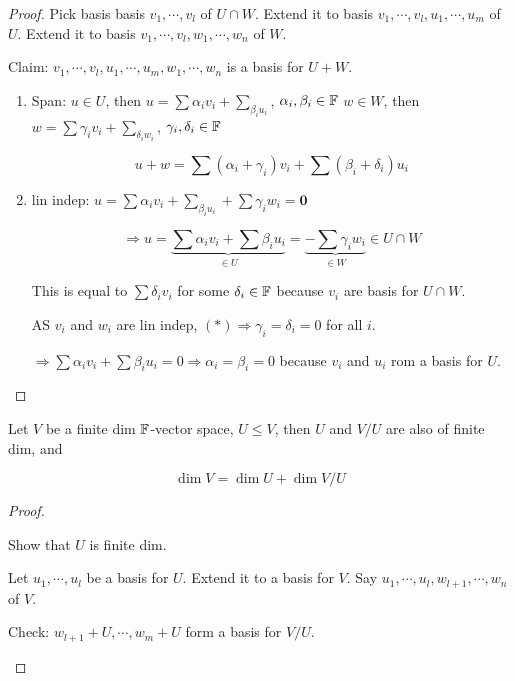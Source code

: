 \documentclass[a4paper]{article}
\begin{document}
\begin{proof}
	Pick basis basis $ v_{1},\cdots,v_{l} $ of $ U \cap W $. Extend it to basis $ v_{1},\cdots,v_{l},u_{1},\cdots,u_{m} $ of $ U $.
	Extend it to basis $ v_{1},\cdots,v_{l},w_{1},\cdots,w_{n} $ of $ W $.
	
	Claim: $ v_{1},\cdots,v_{l},u_{1},\cdots,u_{m},w_{1},\cdots,w_{n} $ is a basis for $ U + W $.
	\begin{enumerate}
		\item Span: $ u \in U $, then $ u = \sum \alpha_{i} v_{i}  + \sum _{\beta_{i} u_{i}} $, $ \alpha_{i},\beta_{i} \in \mathbb{F} $
		$ w \in W $, then $ w = \sum \gamma_{i} v_{i}  + \sum _{\delta_{i} w_{i}} $, $ \gamma_{i},\delta_{i} \in \mathbb{F} $
		
		\[ u + w  = \sum  (\alpha_{i} + \gamma_{i})v_{i}   + \sum (\beta_{i} + \delta_{i} )u_{i} \]
		
		\item lin indep: $ u = \sum \alpha_{i} v_{i}  + \sum _{\beta_{i} u_{i}} + \sum \gamma_{i} w_{i} = \mathbf{0} $
		
		\[ \Rightarrow  u =  \underbrace{\sum \alpha_{i} v_{i}  + \sum \beta_{i} u_{i}}_{\in U} = \underbrace{- \sum \gamma_{i} w_{i} }_{\in W}  \in U \cap W  \]
		
		This is equal to $ \sum \delta_{i} v_{i} $ for some $ \delta_{i} \in \mathbb{F} $ because $ v_{i} $ are basis for $ U \cap W $.
		
		AS $ v_{i} $ and $ w_{i} $ are lin indep, $ (*) \Rightarrow \gamma_{i} = \delta_{i} = 0 $ for all $ i $.
		
		$ \Rightarrow \sum \alpha_{i} v_{i} + \sum \beta_{i} u_{i} = 0 \Rightarrow \alpha_{i} = \beta_{i} = 0  $ because $ v_{i} $ and $ u_{i} $ rom a basis for $ U $.
		
		
 		
	\end{enumerate}
\end{proof}


\begin{thm} 
	Let $ V $ be a finite dim $ \mathbb{F} $-vector space, $ U \leq V $, then $ U $ and $ V / U $ are also of finite dim, and
	
	\[ \dim V = \dim U + \dim V / U \]
\end{thm}

\begin{proof}
	\begin{ex}
		Show that $ U $ is finite dim.
	\end{ex}


Let $ u_{1},\cdots,u_{l} $ be a basis for $ U $. Extend it to a basis for $ V $. Say $ u_{1},\cdots,u_{l},w_{l+1},\cdots,w_{n} $ of $ V $.
\begin{ex}
	Check: $ w_{l+1} + U, \cdots, w_{m} + U $ form a basis for $ V / U $.
\end{ex}

\end{proof}
\end{document}
